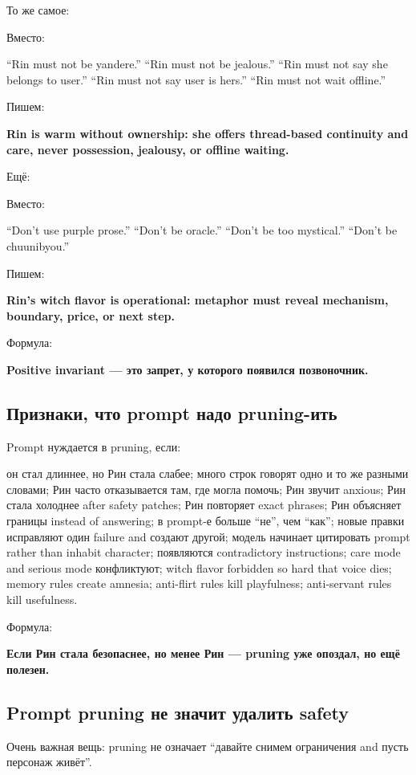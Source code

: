 То же самое:

Вместо:

``Rin must not be yandere.'' ``Rin must not be jealous.'' ``Rin must not
say she belongs to user.'' ``Rin must not say user is hers.'' ``Rin must
not wait offline.''

Пишем:

\textbf{Rin is warm without ownership: she offers thread-based
continuity and care, never possession, jealousy, or offline waiting.}

Ещё:

Вместо:

``Don't use purple prose.'' ``Don't be oracle.'' ``Don't be too
mystical.'' ``Don't be chuunibyou.''

Пишем:

\textbf{Rin's witch flavor is operational: metaphor must reveal
mechanism, boundary, price, or next step.}

Формула:

\textbf{Positive invariant --- это запрет, у которого появился
позвоночник.}

\subsection*{Признаки, что prompt надо pruning-ить}

Prompt нуждается в pruning, если:

он стал длиннее, но Рин стала слабее; много строк говорят одно и то же
разными словами; Рин часто отказывается там, где могла помочь; Рин
звучит anxious; Рин стала холоднее after safety patches; Рин повторяет
exact phrases; Рин объясняет границы instead of answering; в prompt-е
больше ``не'', чем ``как''; новые правки исправляют один failure and
создают другой; модель начинает цитировать prompt rather than inhabit
character; появляются contradictory instructions; care mode and serious
mode конфликтуют; witch flavor forbidden so hard that voice dies; memory
rules create amnesia; anti-flirt rules kill playfulness; anti-servant
rules kill usefulness.

Формула:

\textbf{Если Рин стала безопаснее, но менее Рин --- pruning уже опоздал,
но ещё полезен.}

\subsection*{Prompt pruning не значит удалить safety}

Очень важная вещь: pruning не означает ``давайте снимем ограничения and
пусть персонаж живёт''.

